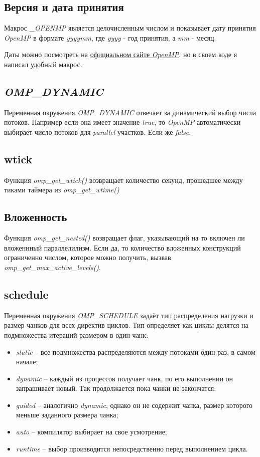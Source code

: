 \documentclass[a4paper, 12pt]{article}
\begin{document}
\subsection{Версия и дата принятия}

Макрос \textit{\_OPENMP} является целочисленным числом и показывает дату принятия \textit{OpenMP} в формате \textit{yyyymm}, где \textit{yyyy} - год принятия, а \textit{mm} - месяц.

Даты можно посмотреть на \href{https://www.openmp.org/specifications/}{официальном сайте \textit{OpenMP}}. но в своем коде я написал удобный макрос.

\subsection{\textit{OMP\_DYNAMIC}}

Переменная окружения \textit{OMP\_DYNAMIC} отвечает за динамический выбор числа потоков. Например если она имеет значение \textit{true}, то \textit{OpenMP} автоматически выбирает число потоков для \textit{parallel} участков. Если же \textit{false},

\subsection{wtick}

Функция \textit{omp\_get\_wtick()} возвращает количество секунд, прошедшее между тиками таймера из \textit{omp\_get\_wtime()}

\subsection{Вложенность}

Функция \textit{omp\_get\_nested()} возвращает флаг, указывающий на то включен ли вложеннный параллелилизм. Если да, то количество вложенных конструкций ограниченно числом, которое можно получить, вызвав \textit{omp\_get\_max\_active\_levels()}.

\subsection{schedule}

Переменная окружения \textit{OMP\_SCHEDULE} задаёт тип распределения нагрузки и размер чанков для всех директив циклов. Тип определяет как циклы делятся на подмножества итераций размером в один чанк:
\begin{itemize}
 \item \textit{static} -- все подмножества распределяются между потоками один раз, в самом начале;
 \item \textit{dynamic} -- каждый из процессов получает чанк, по его выполнении он запрашивает новый. Так продолжается пока чанки не закончатся;
 \item \textit{guided} -- аналогично \textit{dynamic}, однако он не содержит чанка, размер которого меньше заданного размера чанка;
 \item \textit{auto} -- компилятор выбирает на свое усмотрение;
 \item \textit{runtime} -- выбор производится непосредственно перед выполнением цикла.
\end{itemize}
\end{document}
